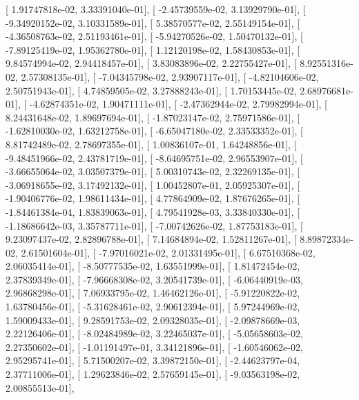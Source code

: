 \documentclass{article}
\begin{document}
       [  1.91747818e-02,   3.33391040e-01],
       [ -2.45739559e-02,   3.13929790e-01],
       [ -9.34920152e-02,   3.10331589e-01],
       [  5.38570577e-02,   2.55149154e-01],
       [ -4.36508763e-02,   2.51193461e-01],
       [ -5.94270526e-02,   1.50470132e-01],
       [ -7.89125419e-02,   1.95362780e-01],
       [  1.12120198e-02,   1.58430853e-01],
       [  9.84574994e-02,   2.94418457e-01],
       [  3.83083896e-02,   2.22755427e-01],
       [  8.92551316e-02,   2.57308135e-01],
       [ -7.04345798e-02,   2.93907117e-01],
       [ -4.82104606e-02,   2.50751943e-01],
       [  4.74859505e-02,   3.27888243e-01],
       [  1.70153445e-02,   2.68976681e-01],
       [ -4.62874351e-02,   1.90471111e-01],
       [ -2.47362944e-02,   2.79982994e-01],
       [  8.24431648e-02,   1.89697694e-01],
       [ -1.87023147e-02,   2.75971586e-01],
       [ -1.62810030e-02,   1.63212758e-01],
       [ -6.65047180e-02,   2.33533352e-01],
       [  8.81742489e-02,   2.78697355e-01],
       [  1.00836107e-01,   1.64248856e-01],
       [ -9.48451966e-02,   2.43781719e-01],
       [ -8.64695751e-02,   2.96553907e-01],
       [ -3.66655064e-02,   3.03507379e-01],
       [  5.00310743e-02,   2.32269135e-01],
       [ -3.06918655e-02,   3.17492132e-01],
       [  1.00452807e-01,   2.05925307e-01],
       [ -1.90406776e-02,   1.98611434e-01],
       [  4.77864909e-02,   1.87676265e-01],
       [ -1.84461384e-04,   1.83839063e-01],
       [  4.79541928e-03,   3.33840330e-01],
       [ -1.18686642e-03,   3.35787711e-01],
       [ -7.00742626e-02,   1.87753183e-01],
       [  9.23097437e-02,   2.82896788e-01],
       [  7.14684894e-02,   1.52811267e-01],
       [  8.89872334e-02,   2.61501604e-01],
       [ -7.97016021e-02,   2.01331495e-01],
       [  6.67510368e-02,   2.06035414e-01],
       [ -8.50777535e-02,   1.63551999e-01],
       [  1.81472454e-02,   2.37839349e-01],
       [ -7.96668308e-02,   3.20541739e-01],
       [ -6.06440919e-03,   2.96868298e-01],
       [  7.06933795e-02,   1.46462126e-01],
       [ -5.91220822e-02,   1.63780456e-01],
       [ -5.31628461e-02,   2.90612394e-01],
       [  5.97244969e-02,   1.59009433e-01],
       [  9.28591753e-02,   2.09328035e-01],
       [ -2.09878669e-03,   2.22126406e-01],
       [ -8.02484989e-02,   3.22465037e-01],
       [ -5.05658603e-02,   2.27350602e-01],
       [ -1.01191497e-01,   3.34121896e-01],
       [ -1.60546062e-02,   2.95295741e-01],
       [  5.71500207e-02,   3.39872150e-01],
       [ -2.44623797e-04,   2.37711006e-01],
       [  1.29623846e-02,   2.57659145e-01],
       [ -9.03563198e-02,   2.00855513e-01],
\end{document}
